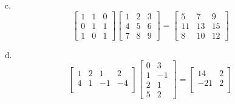 \documentclass[11pt]{article}
\begin{document}
\begin{enumerate}
\begin{enumerate}
              \item[c.]
                    \[
                        \begin{bmatrix}
                            1 & 1 & 0 \\
                            0 & 1 & 1 \\
                            1 & 0 & 1
                        \end{bmatrix}
                        \begin{bmatrix}
                            1 & 2 & 3 \\
                            4 & 5 & 6 \\
                            7 & 8 & 9
                        \end{bmatrix}
                        =
                        \begin{bmatrix}
                            5  & 7  & 9  \\
                            11 & 13 & 15 \\
                            8  & 10 & 12
                        \end{bmatrix}
                    \]

              \item[d.]
                    \[
                        \begin{bmatrix}
                            1 & 2 & 1  & 2  \\
                            4 & 1 & -1 & -4 \\
                        \end{bmatrix}
                        \begin{bmatrix}
                            0 & 3  \\
                            1 & -1 \\
                            2 & 1  \\
                            5 & 2
                        \end{bmatrix}
                        =
                        \begin{bmatrix}
                            14  & 2 \\
                            -21 & 2 \\
                        \end{bmatrix}
                    \]


\end{enumerate}
\end{enumerate}
\end{document}
